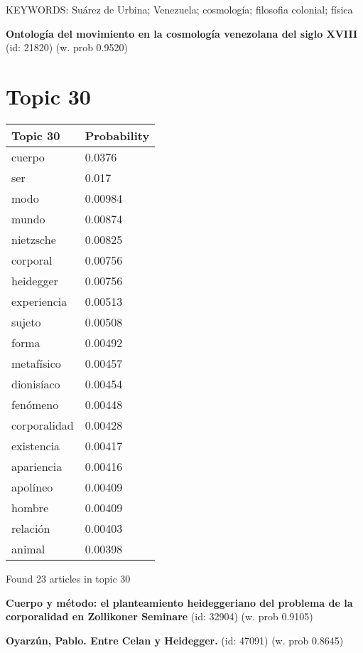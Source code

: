 \documentclass{article}
\begin{document}
KEYWORDS:
Suárez de Urbina; Venezuela; cosmología; filosofia colonial; física
\vfill

\textbf{Ontología del movimiento en la cosmología venezolana del siglo XVIII} (id: 21820)
 (w. prob 0.9520)

\vfill
\newpage


\centering
\thispagestyle{empty}
\section*{Topic 30}\vfill
\begin{tabular}{ll}
\toprule
     Topic 30 & Probability \\
\midrule
       cuerpo &      0.0376 \\
          ser &       0.017 \\
         modo &     0.00984 \\
        mundo &     0.00874 \\
    nietzsche &     0.00825 \\
     corporal &     0.00756 \\
    heidegger &     0.00756 \\
  experiencia &     0.00513 \\
       sujeto &     0.00508 \\
        forma &     0.00492 \\
   metafísico &     0.00457 \\
   dionisíaco &     0.00454 \\
     fenómeno &     0.00448 \\
 corporalidad &     0.00428 \\
   existencia &     0.00417 \\
   apariencia &     0.00416 \\
     apolíneo &     0.00409 \\
       hombre &     0.00409 \\
     relación &     0.00403 \\
       animal &     0.00398 \\
\bottomrule
\end{tabular}

\vfill
Found 23 articles in topic 30
\vfill

\textbf{Cuerpo y método: el planteamiento heideggeriano del problema de la corporalidad en Zollikoner Seminare} (id: 32904)
 (w. prob 0.9105)
\vfill

\textbf{Oyarzún, Pablo. Entre Celan y Heidegger.} (id: 47091)
 (w. prob 0.8645)
\vfill
\end{document}
